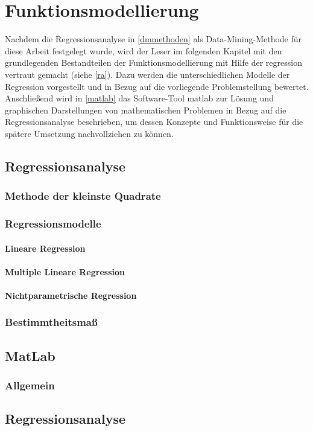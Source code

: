 \section{Funktionsmodellierung}
\label{fm}
Nachdem die Regressionsanalyse in \vref{dmmethoden} als Data-Mining-Methode für diese Arbeit festgelegt wurde, wird der Leser im folgenden Kapitel mit den grundlegenden Bestandteilen der Funktionsmodellierung mit Hilfe der \gls{regression} vertraut gemacht (siehe \vref{ra}). Dazu werden die unterschiedlichen Modelle der Regression vorgestellt und in Bezug auf die vorliegende Problemstellung bewertet. Anschließend wird in \vref{matlab} das Software-Tool \gls{matlab} zur Lösung und graphischen Darstellungen von mathematischen Problemen in Bezug auf die Regressionsanalyse beschrieben, um dessen Konzepte und Funktionsweise für die spätere Umsetzung nachvollziehen zu können.


\subsection{Regressionsanalyse}
\label{ra}

\subsubsection{Methode der kleinste Quadrate}

\subsubsection{Regressionsmodelle}

\paragraph{Lineare Regression}

\paragraph{Multiple Lineare Regression}

\paragraph{Nichtparametrische Regression}

\subsubsection{Bestimmtheitsmaß}

\subsection{MatLab}
\label{matlab}

\subsubsection{Allgemein}

\subsection{Regressionsanalyse}